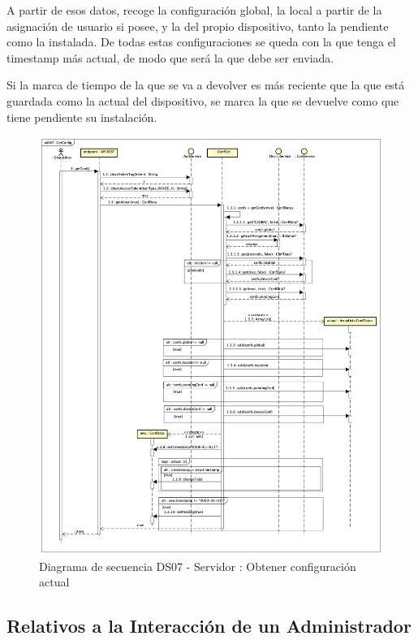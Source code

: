 A partir de esos datos, recoge la configuración global, la local a partir de la asignación de usuario si posee, y la del propio dispositivo, tanto la pendiente como la instalada. De todas estas configuraciones se queda con la que tenga el timestamp más actual, de modo que será la que debe ser enviada.

Si la marca de tiempo de la que se va a devolver es más reciente que la que está guardada como la actual del dispositivo, se marca la que se devuelve como que tiene pendiente su instalación.
\newpage

\begin{figure}[H]
    \centering
    \includegraphics[width=14cm]{./img/sequence/diagram/getConfig.png}
    \caption{Diagrama de secuencia DS07 - Servidor : Obtener configuración actual}
    \label{fig:seq.GetCurrentConf}
\end{figure}

\subsection{Relativos a la Interacción de un Administrador}

